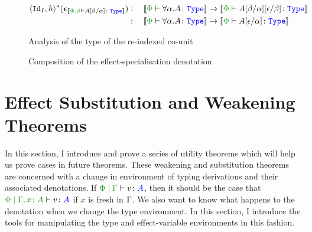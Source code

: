 \documentclass{Report}
\begin{document}
\begin{figure}[H]
    \begin{framed}
        \begin{align*}
            \pr{\Id{I}}{h}\star(\counit{\deno{\typerelation{\P,\b}{A\ssub{\a}{\b}}{\type}}}) & : \quad \deno{\typerelation{\P}{\all{\a}{A}}{\type}} \rightarrow \deno{\typerelation{\P}{A\ssub{\a}{\b}\ssub{\b}{\e}}{\type}}\\
            & : \quad \deno{\typerelation{\P}{\all{\a}{A}}{\type}} \rightarrow \deno{\typerelation{\P}{A\ssub{\a}{\e}}{\type}}
        \end{align*}
    \end{framed}
    \caption{Analysis of the type of the re-indexed co-unit}
    \label{ReIndexedCoUnitType}
\end{figure}


 
\begin{figure}[H]
    \begin{framed}
        \centering
    \end{framed}
    \caption{Composition of the effect-specialisation denotation}
    \label{EffectSpecComp}
\end{figure}



\section{Effect Substitution and Weakening Theorems}\label{SubsAndWeakening}


In this section, I introduce and prove a series of utility theorems which will help us prove cases in future theorems. These weakening and substitution theorems are concerned with a change in environment of typing derivations and their associated denotations. If $\gpetyperelation{v}{A}$, then it should be the case that $\etyperelation{\P}{\gax}{v}{A}$ if $x$ is fresh in $\Gamma$. We also want to know what happens to the denotation when we change the type environment. In this section, I introduce the tools for manipulating the type and effect-variable environments in this fashion.
\end{document}

